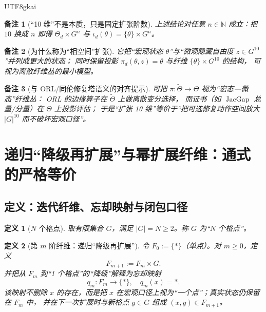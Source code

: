 \documentclass[12pt]{article}
\newtheorem{definition}{定义}[section]
\newtheorem{remark}{备注}[section]
\newcommand{\NN}{\mathbb{N}}
\newcommand{\JacGap}{\operatorname{JacGap}}
\begin{document}
\begin{CJK*}{UTF8}{gkai}
\begin{remark}[“10 维”不是本质，只是固定扩张阶数]
上述结论对任意 $n\in\NN$ 成立：把 $10$ 换成 $n$ 即得 $\Theta_d\times G^n$ 与 $\iota_d(\theta)=\{\theta\}\times G^n$。
\end{remark}

\begin{remark}[为什么称为“相空间”扩张]
它把“宏观状态 $\theta$”与“微观隐藏自由度 $z\in G^{10}$”并列成更大的状态；
同时保留投影 $\pi_d(\theta,z)=\theta$ 与纤维 $\{\theta\}\times G^{10}$ 的结构，
可视为离散纤维丛的最小模型。
\end{remark}

\begin{remark}[与 ORL/同伦修复塔语义的对齐提示]
可把 $\pi:\widetilde{\Theta}\to\Theta$ 视为“宏态—微态”纤维丛：
ORL 的边缘算子在 $\widetilde{\Theta}$ 上做离散变分选择，
而证书（如 $\JacGap$ 总量/分量）在 $\Theta$ 上投影评估；
于是“扩张 10 维”等价于“把可选修复动作空间放大 $|G|^{10}$ 而不破坏宏观口径”。
\end{remark}

\clearpage

\section{递归“降级再扩展”与幂扩展纤维：通式的严格等价}
\label{sec:tex27-ch2-recursive-fiber}

\subsection{定义：迭代纤维、忘却映射与闭包口径}
\label{subsec:tex27-ch2-defs}

\begin{definition}[$N$ 个格点]
\label{def:tex27-ch2-g}
取有限集合 $G$，满足 $|G|=N\ge 2$。称 $G$ 为“$N$ 个格点”。
\end{definition}

\begin{definition}[第 $m$ 阶纤维：递归“降级再扩展”]
\label{def:tex27-ch2-fm}
令 $F_0:=\{\ast\}$（单点）。对 $m\ge 0$，定义
\[
  F_{m+1}:=F_m\times G.
\]
并把从 $F_m$ 到“1 个格点”的“降级”解释为忘却映射
\[
  q_m:F_m\to\{\ast\},\quad q_m(x)=\ast.
\]
该映射不删除 $x$ 的存在，而是把 $x$ 在宏观口径上视为“一个点”；真实状态仍保留在 $F_m$ 中，
并在下一次扩展时与新格点 $g\in G$ 组成 $(x,g)\in F_{m+1}$。
\end{definition}


\end{CJK*}
\end{document}
